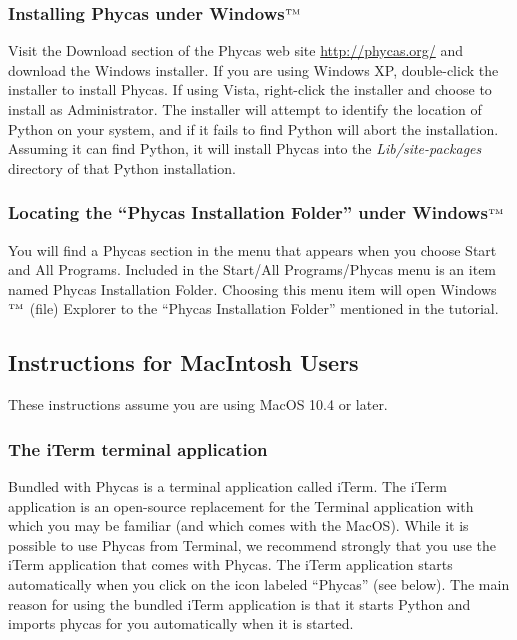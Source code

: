 \documentclass[10pt]{article}
\newcommand{\trademark}[1]{#1${}^{\mbox{\tiny TM}}$}
\newcommand{\pathname}[1]{{\em #1}}			%
\newcommand{\menu}[1]{{\sf #1}}				%
\begin{document}
\subsubsection{Installing Phycas under \trademark{Windows}}

Visit the Download section of the Phycas web site \url{http://phycas.org/} and download the Windows installer. If you are using Windows XP, double-click the installer to install Phycas. If using Vista, right-click the installer and choose to install as Administrator. The installer will attempt to identify the location of Python on your system, and if it fails to find Python will abort the installation. Assuming it can find Python, it will install Phycas into the \pathname{Lib/site-packages} directory of that Python installation. 

\subsubsection{Locating the ``Phycas Installation Folder'' under \trademark{Windows}} \label{subsubsec:installfolderwindows}

You will find a Phycas section in the menu that appears when you choose \menu{Start} and \menu{All Programs}. Included in the \menu{Start/All Programs/Phycas} menu is an item named \menu{Phycas Installation Folder}. Choosing this menu item will open \trademark{Windows} (file) Explorer to the ``Phycas Installation Folder'' mentioned in the tutorial.

\subsection{Instructions for MacIntosh Users}

These instructions assume you are using MacOS 10.4 or later.

\subsubsection{The iTerm terminal application}

Bundled with Phycas is a terminal application called iTerm. The iTerm application is an open-source replacement for the Terminal application with which you may be familiar (and which comes with the MacOS). While it is possible to use Phycas from Terminal, we recommend strongly that you use the iTerm application that comes with Phycas. The iTerm application starts automatically when you click on the icon labeled ``Phycas'' (see below). The main reason for using the bundled iTerm application is that it starts Python and imports phycas for you automatically when it is started.
\end{document}
